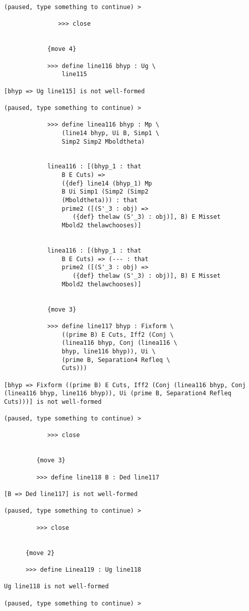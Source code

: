 \documentclass[12pt]{article}
\begin{document}
\begin{verbatim}
(paused, type something to continue) >

               >>> close


            {move 4}

            >>> define line116 bhyp : Ug \
                line115

[bhyp => Ug line115] is not well-formed

(paused, type something to continue) >

            >>> define linea116 bhyp : Mp \
                (line14 bhyp, Ui B, Simp1 \
                Simp2 Simp2 Mboldtheta)


            linea116 : [(bhyp_1 : that 
                B E Cuts) => 
                ({def} line14 (bhyp_1) Mp 
                B Ui Simp1 (Simp2 (Simp2 
                (Mboldtheta))) : that 
                prime2 ([(S'_3 : obj) => 
                   ({def} thelaw (S'_3) : obj)], B) E Misset 
                Mbold2 thelawchooses)]


            linea116 : [(bhyp_1 : that 
                B E Cuts) => (--- : that 
                prime2 ([(S'_3 : obj) => 
                   ({def} thelaw (S'_3) : obj)], B) E Misset 
                Mbold2 thelawchooses)]


            {move 3}

            >>> define line117 bhyp : Fixform \
                ((prime B) E Cuts, Iff2 (Conj \
                (linea116 bhyp, Conj (linea116 \
                bhyp, line116 bhyp)), Ui \
                (prime B, Separation4 Refleq \
                Cuts)))

[bhyp => Fixform ((prime B) E Cuts, Iff2 (Conj (linea116 bhyp, Conj (linea116 bhyp, line116 bhyp)), Ui (prime B, Separation4 Refleq Cuts)))] is not well-formed

(paused, type something to continue) >

            >>> close


         {move 3}

         >>> define line118 B : Ded line117

[B => Ded line117] is not well-formed

(paused, type something to continue) >

         >>> close


      {move 2}

      >>> define Linea119 : Ug line118

Ug line118 is not well-formed

(paused, type something to continue) >


\end{verbatim}
\end{document}
